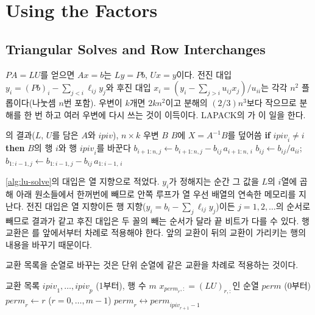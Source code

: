 \section{Using the Factors}
\label{sec:lu-using}

\subsection{Triangular Solves and Row Interchanges}

$PA=LU$를 얻으면 $Ax=b$는 $Ly=Pb$, $Ux=y$이다. 전진 대입 $y_i=(Pb)_i-\sum_{j<i}\ell_{ij}y_j$와 후진 대입 $x_i=(y_i-\sum_{j>i}u_{ij}x_j)/u_{ii}$는 각각 $n^2$ 플롭이다(나눗셈 $n$번 포함). 우변이 $k$개면 $2kn^2$이고 분해의 $(2/3)n^3$보다 작으므로 분해를 한 번 하고 여러 우변에 다시 쓰는 것이 이득이다. LAPACK의 가 이 일을 한다.

\begin{algorithm}[htbp]
\begin{algorithmic}[1]
\Require {}의 결과($L$, $U$를 담은 $A$와 $\mathit{ipiv}$), $n\times k$ 우변 $B$
\Ensure $B$에 $X=A^{-1}B$를 덮어씀
 
  \State \textbf{if} $\mathit{ipiv}_i\ne i$ \textbf{then} $B$의 행 $i$와 행 $\mathit{ipiv}_i$를 바꾼다
\EndFor
{} 
   
    \State $b_{i+1:n,j}\gets b_{i+1:n,j}-b_{ij}\,a_{i+1:n,\,i}$
  \EndFor
   
    \State $b_{ij}\gets b_{ij}/a_{ii}$; \ $b_{1:i-1,j}\gets b_{1:i-1,j}-b_{ij}\,a_{1:i-1,\,i}$
  \EndFor
\EndFor
\end{algorithmic}
\caption{인수로 풀기 (의  경우; 열 지향의 대입)}
\label{alg:lu-solve}
\end{algorithm}

\cref{alg:lu-solve}의 대입은 열 지향으로 적었다. $y_i$가 정해지는 순간 그 값을 $L$의 $i$열에 곱해 아래 원소들에서 한꺼번에 빼므로 안쪽 루프가 열 우선 배열의 연속한 메모리를 지난다. 전진 대입은 열 지향이든 행 지향($y_i=b_i-\sum_j\ell_{ij}y_j$)이든 $j=1,2,\dots$의 순서로 빼므로 결과가 같고 후진 대입은 두 꼴의 빼는 순서가 달라 끝 비트가 다를 수 있다. 행 교환은 를 앞에서부터 차례로 적용해야 한다. 앞의 교환이 뒤의 교환이 가리키는 행의 내용을 바꾸기 때문이다.

교환 목록을 순열로 바꾸는 것은 단위 순열에 같은 교환을 차례로 적용하는 것이다.

\begin{algorithm}[htbp]
\begin{algorithmic}[1]
\Require 교환 목록 $\mathit{ipiv}_1,\dots,\mathit{ipiv}_p$ (1부터), 행 수 $m$
\Ensure $x_{\mathit{perm}_r,:}=(LU)_{r,:}$인 순열 $\mathit{perm}$ (0부터)
\State $\mathit{perm}_r\gets r$ ($r=0,\dots,m-1$)
  \State $\mathit{perm}_r\leftrightarrow\mathit{perm}_{\mathit{ipiv}_{r+1}-1}$
\EndFor
\end{algorithmic}
\caption{교환 목록에서 순열로 (stardust 의 )}
\label{alg:lu-perm}
\end{algorithm}

